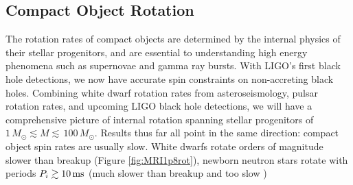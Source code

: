 {\color{orange}

\subsection{Compact Object Rotation}

The rotation rates of compact objects are determined by the internal physics of their stellar progenitors, and are essential to understanding high energy phenomena such as supernovae and gamma ray bursts. With LIGO's first black hole detections, we now have accurate spin constraints on non-accreting black holes. Combining white dwarf rotation rates from asteroseismology, pulsar rotation rates, and upcoming LIGO black hole detections, we will have a comprehensive picture of internal rotation spanning stellar progenitors of $1 \, M_\odot \lesssim M \lesssim \, 100 \, M_\odot$. Results thus far all point in the same direction: compact object spin rates are usually slow. White dwarfs rotate orders of magnitude slower than breakup (Figure \ref{fig:MRI1p8rot}), newborn neutron stars rotate with periods $P_{i} \gtrsim 10 \, {\rm ms}$ (much slower than breakup and too slow )

}